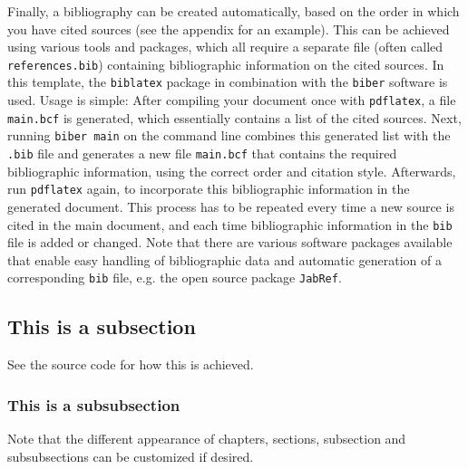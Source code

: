 Finally, a bibliography can be created automatically, based on the order in which you have cited sources (see the appendix for an example).
This can be achieved using various tools and packages, which all require a separate file (often called \texttt{references.bib}) containing bibliographic information on the cited sources.
In this template, the \texttt{biblatex} package in combination with the \texttt{biber} software is used.
Usage is simple: After compiling your document once with \texttt{pdflatex}, a file \texttt{main.bcf} is generated, which essentially contains a list of the cited sources.
Next, running \texttt{biber main} on the command line combines this generated list with the \texttt{.bib} file and generates a new file \texttt{main.bcf} that contains the required bibliographic information, using the correct order and citation style.
Afterwards, run \texttt{pdflatex} again, to incorporate this bibliographic information in the generated document.
This process has to be repeated every time a new source is cited in the main document, and each time bibliographic information in the \texttt{bib} file is added or changed.
Note that there are various software packages available that enable easy handling of bibliographic data and automatic generation of a corresponding \texttt{bib} file, e.g. the open source package \texttt{JabRef}.

\subsection{This is a subsection}
See the source code for how this is achieved.

\subsubsection{This is a subsubsection}
Note that the different appearance of chapters, sections, subsection and subsubsections can be customized if desired.


